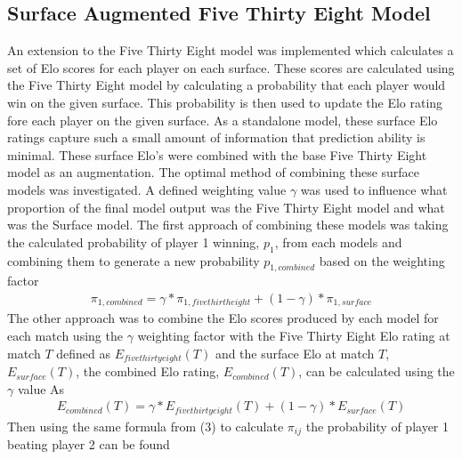 \documentclass[12pt,a4paper]{article}
\begin{document}
\subsection{Surface Augmented Five Thirty Eight Model}
An extension to the Five Thirty Eight model was implemented which calculates a set of
Elo scores for each player on each surface. These scores are calculated using the
Five Thirty Eight model by calculating a probability that each player would win on the
given surface. This probability is then used to update the Elo rating fore each player
on the given surface. As a standalone model, these surface Elo ratings capture such a
small amount of information that prediction ability is minimal. These surface Elo's were
combined with the base Five Thirty Eight model as an augmentation.
The optimal method of combining these surface models was investigated. A defined weighting
value $\gamma$ was used to influence what proportion of the final model output was
the Five Thirty Eight model and what was the Surface model. The first approach of
combining these models was taking the calculated probability of player 1 winning, $p_1$,
from each models and combining them to generate a new probability $p_{1,combined}$ based
on the weighting factor
\begin{gather}
  \pi_{1,combined} = \gamma*\pi_{1,fivethirtheight} + (1-\gamma)*\pi_{1,surface}
\end{gather}
The other approach was to combine the Elo scores produced by each model for each match
using the $\gamma$ weighting factor with the Five Thirty Eight Elo rating at match $T$
defined as $E_{fivethirtyeight}(T)$ and the surface Elo at match $T$, $E_{surface}(T)$,
the combined Elo rating, $E_{combined}(T)$, can be calculated using the $\gamma$ value As
\begin{gather}
  E_{combined}(T) = \gamma*E_{fivethirtyeight}(T) + (1-\gamma)*E_{surface}(T)
\end{gather}
Then using the same formula from (3) to calculate $\pi_{ij}$ the probability of player
1 beating player 2 can be found
\clearpage
\end{document}
